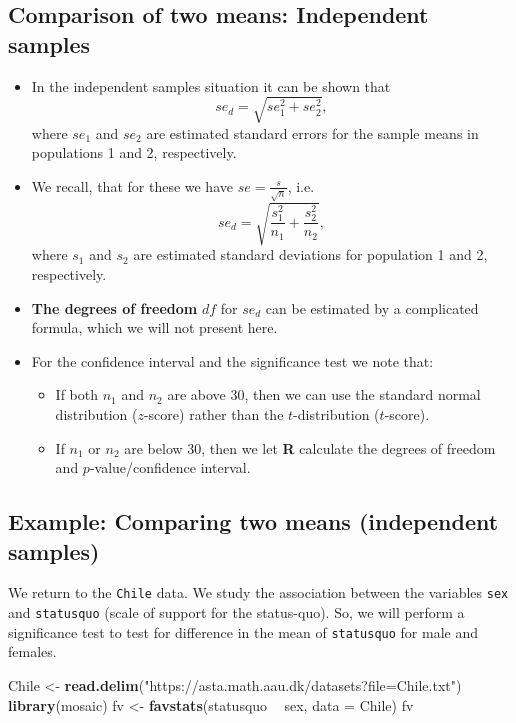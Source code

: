 \documentclass[]{article}
\newenvironment{Shaded}{\begin{snugshade}}{\end{snugshade}}
\newcommand{\KeywordTok}[1]{\textcolor[rgb]{0.13,0.29,0.53}{\textbf{#1}}}
\newcommand{\DataTypeTok}[1]{\textcolor[rgb]{0.13,0.29,0.53}{#1}}
\newcommand{\StringTok}[1]{\textcolor[rgb]{0.31,0.60,0.02}{#1}}
\newcommand{\OperatorTok}[1]{\textcolor[rgb]{0.81,0.36,0.00}{\textbf{#1}}}
\newcommand{\NormalTok}[1]{#1}
\providecommand{\tightlist}{%
  \setlength{\itemsep}{0pt}\setlength{\parskip}{0pt}}
\begin{document}
\subsection{Comparison of two means: Independent
samples}\label{comparison-of-two-means-independent-samples}

\begin{itemize}
\tightlist
\item
  In the independent samples situation it can be shown that \[
    se_d=\sqrt{se_1^2+se_2^2},
    \] where \(se_1\) and \(se_2\) are estimated standard errors for the
  sample means in populations 1 and 2, respectively.
\item
  We recall, that for these we have \(se=\frac{s}{\sqrt{n}}\), i.e. \[
     se_d=\sqrt{\frac{s_1^2}{n_1}+\frac{s_2^2}{n_2}},
     \] where \(s_1\) and \(s_2\) are estimated standard deviations for
  population 1 and 2, respectively.
\item
  \textbf{The degrees of freedom} \(df\) for \(se_d\) can be estimated
  by a complicated formula, which we will not present here.
\item
  For the confidence interval and the significance test we note that:

  \begin{itemize}
  \tightlist
  \item
    If both \(n_1\) and \(n_2\) are above 30, then we can use the
    standard normal distribution (\(z\)-score) rather than the
    \(t\)-distribution (\(t\)-score).
  \item
    If \(n_1\) or \(n_2\) are below 30, then we let \textbf{R} calculate
    the degrees of freedom and \(p\)-value/confidence interval.
  \end{itemize}
\end{itemize}

\subsection{Example: Comparing two means (independent
samples)}\label{example-comparing-two-means-independent-samples}

We return to the \texttt{Chile} data. We study the association between
the variables \texttt{sex} and \texttt{statusquo} (scale of support for
the status-quo). So, we will perform a significance test to test for
difference in the mean of \texttt{statusquo} for male and females.

\begin{Shaded}
\begin{Highlighting}[]
\NormalTok{Chile <-}\StringTok{ }\KeywordTok{read.delim}\NormalTok{(}\StringTok{"https://asta.math.aau.dk/datasets?file=Chile.txt"}\NormalTok{)}
\KeywordTok{library}\NormalTok{(mosaic)}
\NormalTok{fv <-}\StringTok{ }\KeywordTok{favstats}\NormalTok{(statusquo }\OperatorTok{~}\StringTok{ }\NormalTok{sex, }\DataTypeTok{data =}\NormalTok{ Chile)}
\NormalTok{fv}
\end{Highlighting}
\end{Shaded}
\end{document}
